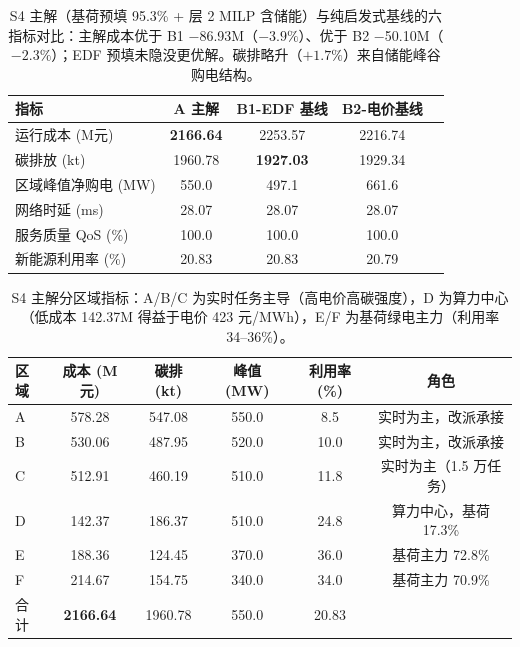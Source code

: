 
\begin{table}[h]
\centering
\footnotesize
\begin{tabular}{lcccc}
\toprule
指标 & A 主解 & B1-EDF 基线 & B2-电价基线 \\
\midrule
运行成本 (M元) & \textbf{2166.64} & 2253.57 & 2216.74 \\
碳排放 (kt) & 1960.78 & \textbf{1927.03} & 1929.34 \\
区域峰值净购电 (MW) & 550.0 & 497.1 & 661.6 \\
网络时延 (ms) & 28.07 & 28.07 & 28.07 \\
服务质量 QoS (\%) & 100.0 & 100.0 & 100.0 \\
新能源利用率 (\%) & 20.83 & 20.83 & 20.79 \\
\bottomrule
\end{tabular}
\caption{S4 主解（基荷预填 95.3\% + 层 2 MILP 含储能）与纯启发式基线的六指标对比：主解成本优于 B1 $-$86.93M（$-3.9\%$）、优于 B2 $-$50.10M（$-2.3\%$）；EDF 预填未隐没更优解。碳排略升（$+1.7\%$）来自储能峰谷购电结构。}
\label{tab:s4-six-metrics}
\end{table}

\begin{table}[h]
\centering
\footnotesize
\begin{tabular}{lccccc}
\toprule
区域 & 成本 (M元) & 碳排 (kt) & 峰值 (MW) & 利用率 (\%) & 角色 \\
\midrule
A & 578.28 & 547.08 & 550.0 & 8.5  & 实时为主，改派承接 \\
B & 530.06 & 487.95 & 520.0 & 10.0 & 实时为主，改派承接 \\
C & 512.91 & 460.19 & 510.0 & 11.8 & 实时为主（1.5 万任务） \\
D & 142.37 & 186.37 & 510.0 & 24.8 & 算力中心，基荷 17.3\% \\
E & 188.36 & 124.45 & 370.0 & 36.0 & 基荷主力 72.8\% \\
F & 214.67 & 154.75 & 340.0 & 34.0 & 基荷主力 70.9\% \\
\midrule
合计 & \textbf{2166.64} & 1960.78 & 550.0 & 20.83 & \\
\bottomrule
\end{tabular}
\caption{S4 主解分区域指标：A/B/C 为实时任务主导（高电价高碳强度），D 为算力中心（低成本 142.37M 得益于电价 423 元/MWh），E/F 为基荷绿电主力（利用率 34--36\%）。}
\label{tab:s4-region}
\end{table}

